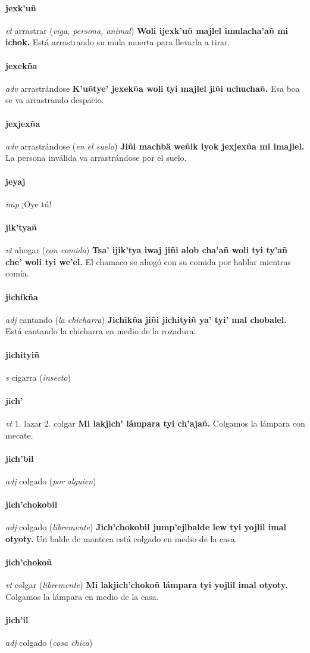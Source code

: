 \documentclass{scrbook}
\newcommand{\entry}[1]{\paragraph{#1}}
\newcommand{\onedefinition}[1]{#1.}
\newcommand{\partofspeech}[1]{\textit{#1}}
\newcommand{\spanishtranslation}[1]{#1}
\newcommand{\clarification}[1]{(\textit{#1})}
\newcommand{\cholexample}[1]{\textbf{#1}}
\newcommand{\exampletranslation}[1]{#1}
\begin{document}
\begin{multicols}{2}
\entry{jexk'uñ}
\partofspeech{vt}
\spanishtranslation{arrastrar}
\clarification{viga, persona, animal}
\cholexample{Woli ijexk'uñ majlel imulacha'añ mi ichok.}
\exampletranslation{Está arrastrando su mula muerta para llevarla a tirar.}

\entry{jexekña}
\partofspeech{adv}
\spanishtranslation{arrastrándose}
\cholexample{K'uñtye' jexekña woli tyi majlel jiñi uchuchañ.}
\exampletranslation{Esa boa se va arrastrando despacio.}

\entry{jexjexña}
\partofspeech{adv}
\spanishtranslation{arrastrándose}
\clarification{en el suelo}
\cholexample{Jiñi machbä weñik iyok jexjexña mi imajlel.}
\exampletranslation{La persona inválida va arrastrándose por el suelo.}

\entry{jeyaj}
\partofspeech{imp}
\spanishtranslation{¡Oye tú!}

\entry{jik'tyañ}
\partofspeech{vt}
\spanishtranslation{ahogar}
\clarification{con comida}
\cholexample{Tsa' ijik'tya iwaj jiñi alob cha'añ woli tyi ty'añ che' woli tyi we'el.}
\exampletranslation{El chamaco se ahogó con su comida por hablar mientras comía.}

\entry{jichikña}
\partofspeech{adj}
\spanishtranslation{cantando}
\clarification{la chicharra}
\cholexample{Jichikña jiñi jichityiñ ya' tyi' mal chobalel.}
\exampletranslation{Está cantando la chicharra en medio de la rozadura.}

\entry{jichityiñ}
\partofspeech{s}
\spanishtranslation{cigarra}
\clarification{insecto}

\entry{jich'}
\partofspeech{vt}
\onedefinition{1}
\spanishtranslation{lazar}
\onedefinition{2}
\spanishtranslation{colgar}
\cholexample{Mi lakjich' lámpara tyi ch'ajañ.}
\exampletranslation{Colgamos la lámpara con mecate.}

\entry{jich'bil}
\partofspeech{adj}
\spanishtranslation{colgado}
\clarification{por alguien}

\entry{jich'chokobil}
\partofspeech{adj}
\spanishtranslation{colgado}
\clarification{libremente}
\cholexample{Jich'chokobil jump'ejlbalde lew tyi yojlil imal otyoty.}
\exampletranslation{Un balde de manteca está colgado en medio de la casa.}

\entry{jich'chokoñ}
\partofspeech{vt}
\spanishtranslation{colgar}
\clarification{libremente}
\cholexample{Mi lakjich'chokoñ lámpara tyi yojlil imal otyoty.}
\exampletranslation{Colgamos la lámpara en medio de la casa.}

\entry{jich'il}
\partofspeech{adj}
\spanishtranslation{colgado}
\clarification{cosa chica}


\end{multicols}
\end{document}
